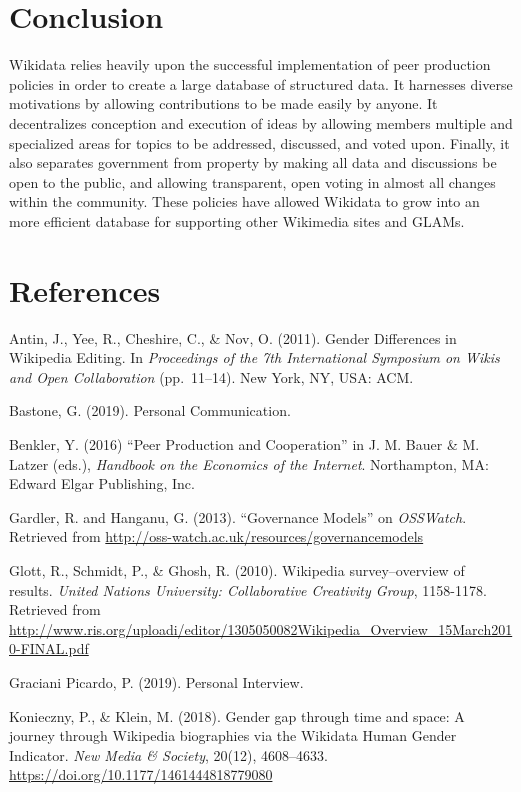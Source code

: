 \documentclass[]{article}
\begin{document}
\hypertarget{conclusion}{%
\section{Conclusion}\label{conclusion}}

Wikidata relies heavily upon the successful implementation of peer
production policies in order to create a large database of structured
data. It harnesses diverse motivations by allowing contributions to be
made easily by anyone. It decentralizes conception and execution of
ideas by allowing members multiple and specialized areas for topics to
be addressed, discussed, and voted upon. Finally, it also separates
government from property by making all data and discussions be open to
the public, and allowing transparent, open voting in almost all changes
within the community. These policies have allowed Wikidata to grow into
an more efficient database for supporting other Wikimedia sites and
GLAMs.

\hypertarget{references}{%
\section{References}\label{references}}

Antin, J., Yee, R., Cheshire, C., \& Nov, O. (2011). Gender Differences
in Wikipedia Editing. In \emph{Proceedings of the 7th International
Symposium on Wikis and Open Collaboration} (pp.~11--14). New York, NY,
USA: ACM.

Bastone, G. (2019). Personal Communication.

Benkler, Y. (2016) ``Peer Production and Cooperation'' in J. M. Bauer \&
M. Latzer (eds.), \emph{Handbook on the Economics of the Internet}.
Northampton, MA: Edward Elgar Publishing, Inc.

Gardler, R. and Hanganu, G. (2013). ``Governance Models'' on
\emph{OSSWatch}. Retrieved from
\url{http://oss-watch.ac.uk/resources/governancemodels}

Glott, R., Schmidt, P., \& Ghosh, R. (2010). Wikipedia survey--overview
of results. \emph{United Nations University: Collaborative Creativity
Group}, 1158-1178. Retrieved from
\url{http://www.ris.org/uploadi/editor/1305050082Wikipedia_Overview_15March2010-FINAL.pdf}

Graciani Picardo, P. (2019). Personal Interview.

Konieczny, P., \& Klein, M. (2018). Gender gap through time and space: A
journey through Wikipedia biographies via the Wikidata Human Gender
Indicator. \emph{New Media \& Society}, 20(12), 4608--4633.
\url{https://doi.org/10.1177/1461444818779080}
\end{document}
